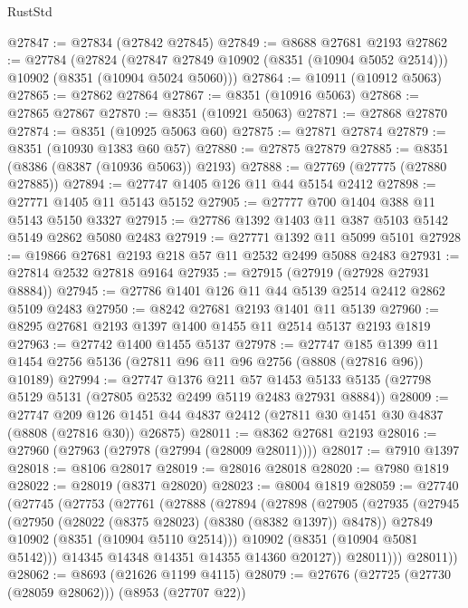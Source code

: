 \begin{lexlean}{RustStd}
\begin{coremodule}
@27847 := @27834 (@27842 @27845)
@27849 := @8688 @27681 @2193
@27862 := @27784
    (@27824 (@27847 @27849 @10902 (@8351 (@10904 @5052 @2514))) @10902 (@8351 (@10904 @5024 @5060)))
@27864 := @10911 (@10912 @5063)
@27865 := @27862 @27864
@27867 := @8351 (@10916 @5063)
@27868 := @27865 @27867
@27870 := @8351 (@10921 @5063)
@27871 := @27868 @27870
@27874 := @8351 (@10925 @5063 @60)
@27875 := @27871 @27874
@27879 := @8351 (@10930 @1383 @60 @57)
@27880 := @27875 @27879
@27885 := @8351 (@8386 (@8387 (@10936 @5063)) @2193)
@27888 := @27769 (@27775 (@27880 @27885))
@27894 := @27747 @1405 @126 @11 @44 @5154 @2412
@27898 := @27771 @1405 @11 @5143 @5152
@27905 := @27777 @700 @1404 @388 @11 @5143 @5150 @3327
@27915 := @27786 @1392 @1403 @11 @387 @5103 @5142 @5149 @2862 @5080 @2483
@27919 := @27771 @1392 @11 @5099 @5101
@27928 := @19866 @27681 @2193 @218 @57 @11 @2532 @2499 @5088 @2483
@27931 := @27814 @2532 @27818 @9164
@27935 := @27915 (@27919 (@27928 @27931 @8884))
@27945 := @27786 @1401 @126 @11 @44 @5139 @2514 @2412 @2862 @5109 @2483
@27950 := @8242 @27681 @2193 @1401 @11 @5139
@27960 := @8295 @27681 @2193 @1397 @1400 @1455 @11 @2514 @5137 @2193 @1819
@27963 := @27742 @1400 @1455 @5137
@27978 := @27747
    @185
    @1399
    @11
    @1454
    @2756
    @5136
    (@27811 @96 @11 @96 @2756 (@8808 (@27816 @96)) @10189)
@27994 := @27747
    @1376
    @211
    @57
    @1453
    @5133
    @5135
    (@27798 @5129 @5131 (@27805 @2532 @2499 @5119 @2483 @27931 @8884))
@28009 := @27747
    @209
    @126
    @1451
    @44
    @4837
    @2412
    (@27811 @30 @1451 @30 @4837 (@8808 (@27816 @30)) @26875)
@28011 := @8362 @27681 @2193
@28016 := @27960 (@27963 (@27978 (@27994 (@28009 @28011))))
@28017 := @7910 @1397
@28018 := @8106 @28017
@28019 := @28016 @28018
@28020 := @7980 @1819
@28022 := @28019 (@8371 @28020)
@28023 := @8004 @1819
@28059 := @27740
    (@27745
      (@27753
        (@27761
          (@27888
            (@27894
              (@27898
                (@27905
                  (@27935
                    (@27945
                      (@27950 (@28022 (@8375 @28023) (@8380 (@8382 @1397)) @8478))
                      @27849
                      @10902
                      (@8351 (@10904 @5110 @2514)))
                    @10902
                    (@8351 (@10904 @5081 @5142)))
                  @14345
                  @14348
                  @14351
                  @14355
                  @14360
                  @20127))
              @28011)))
        @28011))
@28062 := @8693 (@21626 @1199 @4115)
@28079 := @27676
    (@27725 (@27730 (@28059 @28062)))
    (@8953 (@27707 @22))

\end{coremodule}
\end{lexlean}
